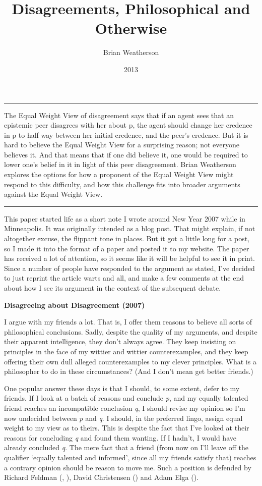 \documentclass[
  10pt,
  letterpaper,
  DIV=11,
  numbers=noendperiod,
  twoside]{scrartcl}
\title{Disagreements, Philosophical and Otherwise}
\author{Brian Weatherson}
\date{2013}
\renewenvironment{abstract}
 {\vspace{-1.25cm}
 \quotation\small\noindent\rule{\linewidth}{.5pt}\par\smallskip
 \noindent }
 {\par\noindent\rule{\linewidth}{.5pt}\endquotation}
\begin{document}
\maketitle
\begin{abstract}
The Equal Weight View of disagreement says that if an agent sees that an
epistemic peer disagrees with her about p, the agent should change her
credence in p to half way between her initial credence, and the peer's
credence. But it is hard to believe the Equal Weight View for a
surprising reason; not everyone believes it. And that means that if one
did believe it, one would be required to lower one's belief in it in
light of this peer disagreement. Brian Weatherson explores the options
for how a proponent of the Equal Weight View might respond to this
difficulty, and how this challenge fits into broader arguments against
the Equal Weight View.
\end{abstract}

This paper started life as a short note I wrote around New Year 2007
while in Minneapolis. It was originally intended as a blog post. That
might explain, if not altogether excuse, the flippant tone in places.
But it got a little long for a post, so I made it into the format of a
paper and posted it to my website. The paper has received a lot of
attention, so it seems like it will be helpful to see it in print. Since
a number of people have responded to the argument as stated, I've
decided to just reprint the article warts and all, and make a few
comments at the end about how I see its argument in the context of the
subsequent debate.

\textbf{Disagreeing about Disagreement (2007)}

I argue with my friends a lot. That is, I offer them reasons to believe
all sorts of philosophical conclusions. Sadly, despite the quality of my
arguments, and despite their apparent intelligence, they don't always
agree. They keep insisting on principles in the face of my wittier and
wittier counterexamples, and they keep offering their own dull alleged
counterexamples to my clever principles. What is a philosopher to do in
these circumstances? (And I don't mean get better friends.)

One popular answer these days is that I should, to some extent, defer to
my friends. If I look at a batch of reasons and conclude \emph{p}, and
my equally talented friend reaches an incompatible conclusion \emph{q},
I should revise my opinion so I'm now undecided between \emph{p} and
\emph{q}. I should, in the preferred lingo, assign equal weight to my
view as to theirs. This is despite the fact that I've looked at their
reasons for concluding \emph{q} and found them wanting. If I hadn't, I
would have already concluded \emph{q}. The mere fact that a friend (from
now on I'll leave off the qualifier `equally talented and informed',
since all my friends satisfy that) reaches a contrary opinion should be
reason to move me. Such a position is defended by Richard Feldman
(,
), David Christensen
() and Adam Elga
().
\end{document}
